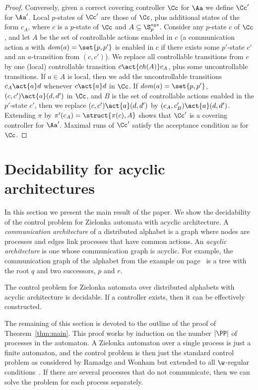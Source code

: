 \documentclass[10pt,a4paper]{article}
\newcommand{\igw}[1]{}
\newcommand{\loc}{\mathit{dom}}
\newcommand{\Ssys}{\S^{sys}}
\newcommand{\ch}{\mathop{ch}}
\begin{document}
\begin{proof}
Conversely, given a correct covering controller $\Cc$ for $\Aa$ we
define $\Cc'$ for $\Aa'$. Local $p$-states of $\Cc'$ are
those of $\Cc$, plus additional states of the form $c_A$, where $c$ is
a $p$-state of $\Cc$ and $A \subseteq \Ssys_p$. Consider any $p$-state
$c$ of $\Cc$, and let $A$ be the set of controllable actions enabled
in $c$ (a communication action $a$ with $\loc(a)=\set{p,p'}$ is enabled
in $c$ if there exists some $p'$-state $c'$ and an $a$-transition from
$(c,c')$). We replace all controllable transitions from $c$ by one
(local) controllable transition $c \act{\ch(A)} c_A$, plus some uncontrollable
transitions. If $a\in A$ is local, then we add the 
uncontrollable transitions $c_A \act{a} d$ whenever  $c
\act{a} d$ in $\Cc$. If $\loc(a)=\set{p,p'}$, $(c,c') \act{a}
(d,d')$ in $\Cc$, and $B$ is the set of controllable actions
enabled in the $p'$-state $c'$,  then we replace $(c,c') \act{a}
(d,d')$ by $(c_A,c'_B) \act{a} (d,d')$. Extending $\pi$ by $\pi'(c_A)=\struct{\pi(c),A}$
shows that $\Cc'$ is a covering controller for $\Aa'$. Maximal runs of $\Cc'$ satisfy the
acceptance condition as for $\Cc$.
\end{proof}



\section{Decidability  for acyclic architectures}\label{sec:reduction}
In this section we present the main result of the paper.  We show the
decidability of the control problem for Zielonka automata with acyclic
architecture. A \emph{communication architecture} of a distributed
alphabet is a graph where nodes are processes and edges link processes
that have common actions. An \emph{acyclic architecture} is one whose
communication graph is acyclic\igw{changed}. For example, the communication graph
of the alphabet from the example on
page~\pageref{ex:control}\igw{reference} is a tree with the root $q$
and two successors, $p$ and $r$.

\begin{theorem}\label{thm:main}
The control problem for Zielonka automata over distributed alphabets
  with acyclic architecture is decidable. If a controller exists, then
  it can be effectively constructed.
\end{theorem}

The remaining of this section is devoted to the outline of the proof
of Theorem~\ref{thm:main}. This proof works by induction on the number
$|\PP|$ of processes in the automaton. A Zielonka automaton over a
single process is just a finite automaton, and the control problem is
then just the standard control problem as considered by Ramadge and
Wonham but extended to all $\w$-regular conditions~\cite{AVW02}. If
there are several processes that do not communicate, then we can solve
the problem for each process separately.
\end{document}
